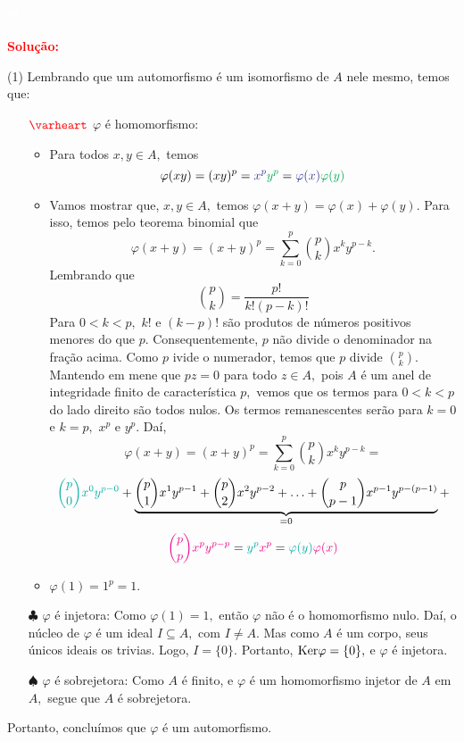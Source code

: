 \documentclass[11pt,a4paper]{article}
\newcommand{\dividiritens}[1]{\begin{tasks}[counter-format={(tsk[a])},label-width=3.6ex, label-format = {\bfseries}, column-sep = {0pt}](1) #1 \end{tasks}}
\newcommand{\pers}[1]{\textcolor{Floresta}{$\negrito{(#1)} $}}
\newcommand{\solucao}[1]{
\textbf{\textcolor{white}{oi}\\ \\ \textcolor{red}{Solução:}} #1}
\begin{document}
\solucao{
\dividiritens{
\task[\pers{a}] Lembrando que um automorfismo é um isomorfismo de $A$ nele mesmo, temos que:
\begin{itemize}
    \item[$\textcolor{red}{\varheart}$] $\varphi$ é homomorfismo:
\begin{itemize}
    \item  Para todos $x, y \in A,$ temos 
    \[
    \varphi(xy) = (xy)^p = \textcolor{Blue}{x^p}\textcolor{Green}{y^p} = \textcolor{Blue}{\varphi(x)}\textcolor{Green}{\varphi(y)}
    \]
    \item Vamos mostrar que, $x, y \in A,$ temos $\varphi(x+y) = \varphi(x) + \varphi(y).$ Para isso, temos pelo teorema binomial que
    \[
    \varphi(x + y) = (x+y)^p = \sum\limits_{k=0}^p \binom{p}{k} x^k y^{p-k}.
    \]
Lembrando que
\[
\binom{p}{k} = \frac{p!}{k!(p-k)!}
\]
Para $0 < k < p,$ $k!$ e $(k-p)!$ são produtos de números positivos menores do que $p.$ Consequentemente, $p$ não divide o denominador na fração acima. Como $p$ ivide o numerador, temos que $p$ divide $\binom{p}{k}.$ Mantendo em mene que $pz = 0$ para todo $z \in A,$ pois $A$ é um anel de integridade finito de característica $p,$ vemos que os termos para $0 < k< p$ do lado direito são todos nulos. Os termos remanescentes serão para $k = 0$ e $k = p,$ $x^p$ e $y^p.$ Daí,
\[
    \varphi(x + y) = (x+y)^p = \sum\limits_{k=0}^p \binom{p}{k} x^k y^{p-k} =\]\[ \textcolor{Emerald}{\binom{p}{0} x^0y^{p-0}} + \underbrace{\binom{p}{1} x^1y^{p-1} + \binom{p}{2} x^2y^{p-2} + \ldots + \binom{p}{p-1} x^{p-1}y^{p-(p-1)}}_{ = 0} + \]\[\textcolor{Magenta}{\binom{p}{p} x^py^{p-p}} = \textcolor{Emerald}{y^p} \textcolor{Magenta}{x^p} = \textcolor{Emerald}{\varphi(y)} \textcolor{Magenta}{\varphi(x)} 
\]

\item $\varphi(1) = 1^p = 1.$
\end{itemize}
   \item[$\clubsuit$] $\varphi$ é injetora: Como $\varphi(1) = 1,$ então $\varphi$ não é o homomorfismo nulo. Daí, o núcleo de $\varphi$ é um ideal $I \subseteq A,$ com $I \neq A.$ Mas como $A$ é um corpo, seus únicos ideais os  trivias. Logo, $I = \{ 0 \}.$ Portanto, ${\rm Ker} \varphi = \{ 0 \},$ e $\varphi$ é injetora.
   \item[$\spadesuit$] $\varphi$ é sobrejetora: Como $A$ é finito, e $\varphi$ é um homomorfismo injetor de $A$ em $A,$ segue que $A$ é sobrejetora.
\end{itemize}

Portanto, concluímos que $\varphi$ é um automorfismo.

}}
\end{document}
